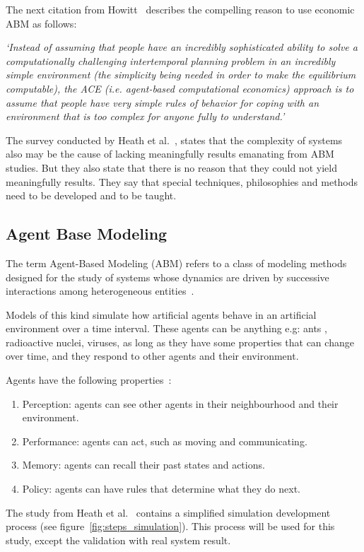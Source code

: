 The next citation from Howitt~\cite{howitt2012have} describes the compelling reason to use economic ABM as follows:

\textit{`Instead of assuming that people have an incredibly sophisticated ability to solve a computationally challenging intertemporal planning problem in an incredibly simple environment (the simplicity being needed in order to make the equilibrium computable), the ACE (i.e.
agent-based computational economics) approach is to assume that people have very simple rules of behavior for coping with an environment that is too complex for anyone fully to understand.'}

The survey conducted by Heath et al.~\cite{heath2009survey}, states that the complexity of systems also may be the cause of lacking meaningfully results emanating from ABM studies.
But they also state that there is no reason that they could not yield meaningfully results.
They say that special techniques, philosophies and methods need to be developed and to be taught.


\subsection{Agent Base Modeling}\label{subsec:agent-base-modeling}
The term Agent-Based Modeling (ABM) refers to a class of modeling methods designed for the study of systems whose dynamics are driven by successive interactions among heterogeneous entities~\cite{tesfatsion2023agent}.

Models of this kind simulate how artificial agents behave in an artificial environment over a time interval.
These agents can be anything e.g: ants , radioactive nuclei, viruses, as long as they have some properties that can change over time, and they respond to other agents and their environment.

Agents have the following properties~\cite{hamill2016agent}:
\begin{enumerate}
  \item Perception: agents can see other agents in their neighbourhood and their environment.
  \item Performance: agents can act, such as moving and communicating.
  \item Memory: agents can recall their past states and actions.
  \item Policy: agents can have rules that determine what they do next.
\end{enumerate}

The study from Heath et al.~\cite{heath2009survey} contains a simplified simulation development process (see figure~\ref{fig:steps_simulation}).
This process will be used for this study, except the validation with real system result.

